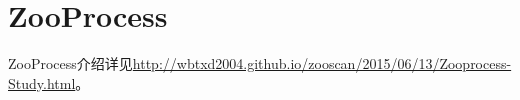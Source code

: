 \documentclass[12pt]{article}
\begin{document}
\section{ZooProcess}
ZooProcess介绍详见\url{http://wbtxd2004.github.io/zooscan/2015/06/13/Zooprocess-Study.html}。

%
%
%





\end{document}
